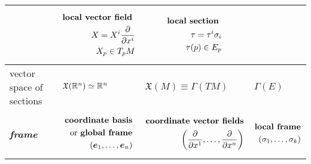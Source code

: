 \documentclass[11pt]{article}
\begin{document}
\begin{itemize}
\begin{table}[h!]
\begin{tabularx}{1\textwidth} { 
  | >{\raggedright\arraybackslash} m{2cm}
  | >{\centering\arraybackslash}X
  | >{\centering\arraybackslash}X
  | >{\centering\arraybackslash}X  | }
\begin{align*}
\end{align*} &  
\begin{align*}
\text{\textbf{local vector field} }\\
X = X^{i}\frac{\partial }{ \partial x^{i}}\\
X_{p} \in T_{p}M
\end{align*}
& \begin{align*}
\text{\textbf{local section} }\\
\tau = \tau^{i}\sigma_{i}\\
\tau(p) \in E_{p}
\end{align*} \\
\hline
vector space of sections & $\mathfrak{X}({\mathbb R}^{n}) \simeq {\mathbb R}^{n}$ & $\mathfrak{X}(M) \equiv \Gamma(TM)$ & $\Gamma(E)$ \\
\hline
\emph{\textbf{frame}} &
\begin{align*}
\text{\textbf{coordinate basis}}\\
\text{or \textbf{global frame}}\\
\left(\boldsymbol{e}_1, \ldots, \boldsymbol{e}_{n}\right)
\end{align*} 
&
\begin{align*}
\text{\textbf{coordinate vector fields}}\\
\left(\frac{\partial }{ \partial x^{1}}, \ldots, \frac{\partial }{ \partial x^{n}}\right)
\end{align*} &
\begin{align*}
\text{\textbf{local frame}}\\
\left(\sigma_1, \ldots, \sigma_{k}\right)
\end{align*} \\
\hline
\end{tabularx}
\end{table}
\end{itemize}
\newpage
\end{document}
